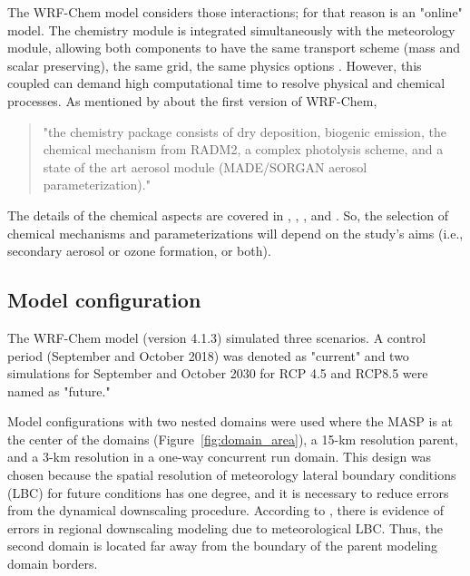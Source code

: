 The WRF-Chem model considers those interactions; for that reason is an "online" model. 
The chemistry module is integrated simultaneously with the meteorology module, allowing both components to have the same transport scheme (mass and scalar preserving), the same grid, the same physics options \citep{Grell2005}.
However, this coupled can demand high computational time to resolve physical and chemical processes.
As mentioned by \cite{Grell2005} about the first version of WRF-Chem,
\begin{quote}
    "the chemistry package consists of dry deposition, biogenic emission, the chemical mechanism from RADM2, a complex photolysis scheme, and a state of the art aerosol module (MADE/SORGAN aerosol parameterization)."
\end{quote}
The details of the chemical aspects are covered in \citet{Zaveri1999}, \cite{Grell2005}, \cite{Fast2006}, and \cite{Gustafson2007}.
So, the selection of chemical mechanisms and parameterizations will depend on the study's aims (i.e., secondary aerosol or ozone formation, or both).

\subsection{Model configuration}
The WRF-Chem model (version 4.1.3) simulated three scenarios.
A control period (September and October 2018) was denoted as "current" and two simulations for September and October 2030 for RCP 4.5 and RCP8.5 were named as "future."

Model configurations with two nested domains were used where the MASP is at the center of the domains (Figure~\ref{fig:domain_area}), a 15-km resolution parent, and a 3-km resolution in a one-way concurrent run domain.
This design was chosen because the spatial resolution of meteorology lateral boundary conditions (LBC) for future conditions has one degree, and it is necessary to reduce  errors from the dynamical downscaling procedure.
According to \citet{Warner2011}, there is evidence of errors in regional downscaling modeling due to meteorological LBC.
Thus, the second domain is located far away from the boundary of the parent modeling domain borders.


